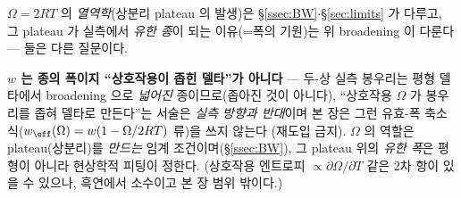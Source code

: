 $\Omega=2RT$ 의 \emph{열역학}(상분리 plateau 의 발생)은 \S\ref{ssec:BW}$\cdot$\S\ref{sec:limits} 가 다루고, 그
plateau 가 실측에서 \emph{유한 종}이 되는 이유(=폭의 기원)는 위 broadening 이 다룬다 --- 둘은 다른 질문이다.
\begin{warnbox}
\textbf{$w$ 는 종의 폭이지 ``상호작용이 좁힌 델타''가 아니다} --- 두-상 실측 봉우리는 평형 델타에서 broadening
으로 \emph{넓어진} 종이므로(좁아진 것이 아니다), ``상호작용 $\Omega$ 가 봉우리를 좁혀 델타로 만든다''는 서술은
\emph{실측 방향과 반대}이며 본 장은 그런 유효-폭 축소식($w_\eff(\Omega)=w(1-\Omega/2RT)$ 류)을 쓰지 않는다
(재도입 금지). $\Omega$ 의 역할은 plateau(상분리)를 \emph{만드는} 임계 조건이며(\S\ref{ssec:BW}), 그 plateau
위의 \emph{유한 폭}은 평형이 아니라 현상학적 피팅이 정한다. (상호작용 엔트로피 $\propto\partial\Omega/\partial T$
같은 2차 항이 있을 수 있으나, 흑연에서 소수이고 본 장 범위 밖이다.)
\end{warnbox}


